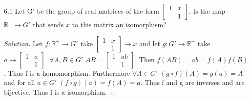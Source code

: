 \documentclass{article}
\newcommand{\R}{\mathbb{R}}
\newenvironment{solution}
{\renewcommand\qedsymbol{$\blacksquare$}\begin{proof}[Solution]}
{\end{proof}}
\begin{document}
\begin{PROB}{6.1}\label{Problem 6.1.}
    Let G' be the group of real matrices of the form $\begin{bmatrix*}{}
        1 & x \\
         & 1
    \end{bmatrix*}$. Is the map $\R^+ \to G'$ that sends $x$ to this matrix an isomorphism?
\end{PROB} 
\begin{solution}
    Let $f: \R^+ \to G'$ take $\begin{bmatrix*}{}
        1 & x \\
         & 1
    \end{bmatrix*} \to x$ and let $g: G' \to \R^+$ take $a \to \begin{bmatrix*}{}
        1 & a \\
         & 1
    \end{bmatrix*}$. $\forall A, B \in G'$ $AB = \begin{bmatrix*}{}
        1 & ab \\
        & 1
    \end{bmatrix*}$. Then $f(AB) = ab = f(A)f(B)$. Thus f is a homomorphism. Furthermore $\forall A \in G'$ $(g \circ f)(A) = g(a) = A$ and for all $a \in G'$ $(f \circ g)(a) = f(A) = a$. Thus f and g are inverses and are bijective. Thus f is a isomorphism.
\end{solution}

\bigskip
\end{document}
